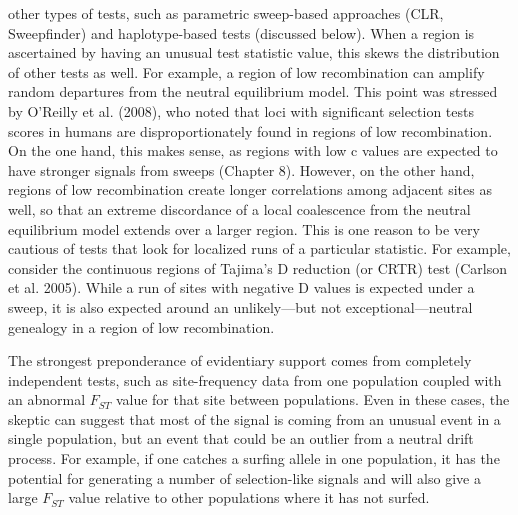 \documentclass{article}
\begin{document}
other types of tests, such as parametric sweep-based approaches (CLR, Sweepfinder) and haplotype-based tests (discussed below). When a region is ascertained by having an unusual test statistic value, this skews the distribution of other tests as well. For example, a region of low recombination can amplify random departures from the neutral equilibrium model. This point was stressed by O'Reilly et al. (2008), who noted that loci with significant selection tests scores in humans are disproportionately found in regions of low recombination. On the one hand, this makes sense, as regions with low c values are expected to have stronger signals from sweeps (Chapter 8). However, on the other hand, regions of low recombination create longer correlations among adjacent sites as well, so that an extreme discordance of a local coalescence from the neutral equilibrium model extends over a larger region. This is one reason to be very cautious of tests that look for localized runs of a particular statistic. For example, consider the continuous regions of Tajima's D reduction (or CRTR) test (Carlson et al. 2005). While a run of sites with negative D values is expected under a sweep, it is also expected around an unlikely—but not exceptional—neutral genealogy in a region of low recombination.

The strongest preponderance of evidentiary support comes from completely independent tests, such as site-frequency data from one population coupled with an abnormal  $ F_{ST} $ value for that site between populations. Even in these cases, the skeptic can suggest that most of the signal is coming from an unusual event in a single population, but an event that could be an outlier from a neutral drift process. For example, if one catches a surfing allele in one population, it has the potential for generating a number of selection-like signals and will also give a large  $ F_{ST} $ value relative to other populations where it has not surfed.
\end{document}
